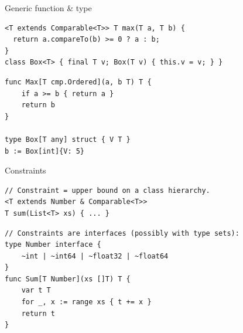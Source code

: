 \documentclass[10pt]{article}
\begin{document}
\begin{construct}{Generic function \& type}
\noindent
\begin{minipage}[t]{0.485\linewidth}
\begin{lstlisting}[style=java, title=Java]
<T extends Comparable<T>> T max(T a, T b) {
  return a.compareTo(b) >= 0 ? a : b;
}
class Box<T> { final T v; Box(T v) { this.v = v; } }
\end{lstlisting}
\end{minipage}\hfill
\begin{minipage}[t]{0.485\linewidth}
\begin{lstlisting}[style=go, title=Go]
func Max[T cmp.Ordered](a, b T) T {
    if a >= b { return a }
    return b
}

type Box[T any] struct { V T }
b := Box[int]{V: 5}
\end{lstlisting}
\end{minipage}
\end{construct}

\begin{construct}{Constraints}
\noindent
\begin{minipage}[t]{0.485\linewidth}
\begin{lstlisting}[style=java, title=Java]
// Constraint = upper bound on a class hierarchy.
<T extends Number & Comparable<T>>
T sum(List<T> xs) { ... }
\end{lstlisting}
\end{minipage}\hfill
\begin{minipage}[t]{0.485\linewidth}
\begin{lstlisting}[style=go, title=Go]
// Constraints are interfaces (possibly with type sets):
type Number interface {
    ~int | ~int64 | ~float32 | ~float64
}
func Sum[T Number](xs []T) T {
    var t T
    for _, x := range xs { t += x }
    return t
}
\end{lstlisting}
\end{minipage}
\end{construct}

\end{document}
